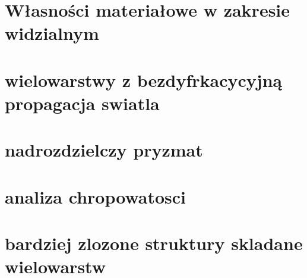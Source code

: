 \section{Własności materiałowe w zakresie widzialnym}
\section{wielowarstwy z bezdyfrkacycyjną propagacja swiatla}
\section{nadrozdzielczy pryzmat}
\section{analiza chropowatosci}
\section{bardziej zlozone struktury skladane wielowarstw}


